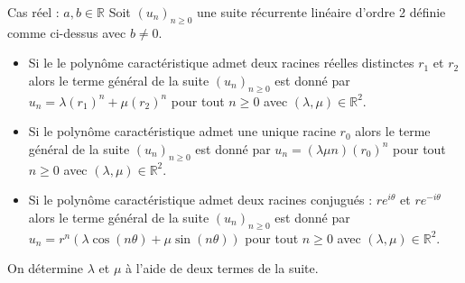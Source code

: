 \documentclass[french,11pt,twoside]{VcCours}
\begin{document}
\begin{Theoreme}{Cas réel : $a,b \in \mathbb{R}$}
Soit $(u_n)_{n \geq 0}$ une suite récurrente linéaire d'ordre 2 définie comme ci-dessus avec $b \neq 0.$
\begin{itemize}
\item Si le le polynôme caractéristique admet deux racines réelles distinctes $r_1$ et $r_2$ alors le terme général de la suite $(u_n)_{n \geq 0}$ est donné par $u_n=\lambda (r_1)^n+\mu (r_2)^n$ pour tout $n \geq 0$ avec $(\lambda,\mu) \in \mathbb{R}^2$.
\item Si le polynôme caractéristique admet une unique racine $r_0$ alors le terme général de la suite $(u_n)_{n \geq 0}$ est donné par $u_n= (\lambda\mu n)(r_0)^n$ pour tout $n \geq 0$ avec $(\lambda,\mu) \in \mathbb{R}^2$.
\item Si le polynôme caractéristique admet deux racines conjugués : $r e^{i \theta}$ et $r e^{- i \theta}$ alors le terme général de la suite $(u_n)_{n \geq 0}$ est donné par $u_n=r^n (\lambda \cos(n \theta)+ \mu \sin(n \theta))$ pour tout $n \geq 0$ avec $(\lambda,\mu) \in \mathbb{R}^2$.
\end{itemize}
\end{Theoreme}

\begin{Remarque}{} On détermine $\lambda$ et $\mu$ à l'aide de deux termes de la suite.
\end{Remarque}
\end{document}
